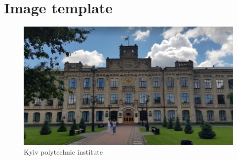 \section{Image template}
\label{sec:template-image}


\begin{figure}[!htp]
	\centering
	\includegraphics[scale=0.3]{content/chapters/99-template-chapter/assets/img/kpi.jpg}
	\caption{Kyiv polytechnic institute}
	\label{fig:kpi}
\end{figure}
